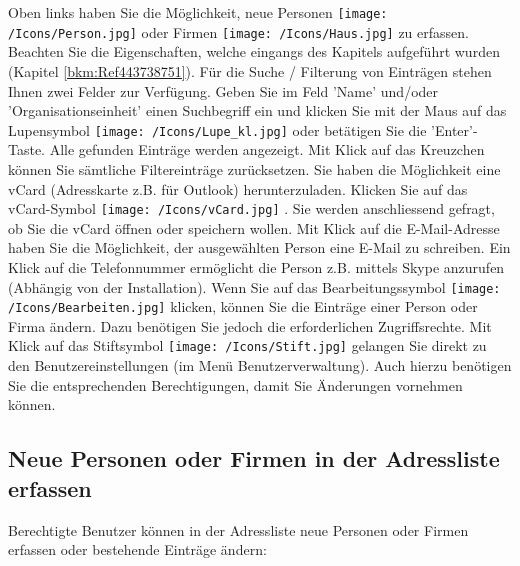 Oben links haben Sie die Möglichkeit, neue Personen \texttt{[image: /Icons/Person.jpg]} oder Firmen \texttt{[image: /Icons/Haus.jpg]} zu erfassen. Beachten Sie die Eigenschaften, welche eingangs des Kapitels aufgeführt wurden (Kapitel \ref{bkm:Ref443738751}). \newline
Für die Suche / Filterung von Einträgen stehen Ihnen zwei Felder zur Verfügung. Geben Sie im Feld 'Name' und/oder 'Organisationseinheit'  einen Suchbegriff ein und klicken Sie mit der Maus auf das Lupensymbol \texttt{[image: /Icons/Lupe\_kl.jpg]}  oder betätigen Sie die 'Enter'-Taste. Alle gefunden Einträge werden angezeigt. Mit Klick auf das Kreuzchen  können Sie sämtliche Filtereinträge zurücksetzen. \newline
Sie haben die Möglichkeit eine vCard (Adresskarte z.B. für Outlook) herunterzuladen. Klicken Sie auf das vCard-Symbol \texttt{[image: /Icons/vCard.jpg]} . Sie werden anschliessend gefragt, ob Sie die vCard öffnen
oder speichern wollen.\newline
Mit Klick auf die E-Mail-Adresse  haben Sie die Möglichkeit, der ausgewählten Person eine E-Mail zu schreiben. Ein Klick auf die Telefonnummer  ermöglicht die Person z.B. mittels Skype anzurufen (Abhängig von der Installation).\newline
Wenn Sie auf das Bearbeitungssymbol \texttt{[image: /Icons/Bearbeiten.jpg]}  klicken, können Sie die Einträge einer Person oder Firma ändern. Dazu benötigen Sie jedoch die erforderlichen Zugriffsrechte. Mit Klick auf das Stiftsymbol \texttt{[image: /Icons/Stift.jpg]}  gelangen Sie direkt zu den Benutzereinstellungen (im Menü Benutzerverwaltung). Auch hierzu benötigen Sie die entsprechenden Berechtigungen, damit Sie Änderungen vornehmen können.

\subsection{Neue Personen oder Firmen in der Adressliste erfassen}
\label{bkm:Ref2018071901}
Berechtigte Benutzer können in der Adressliste neue Personen oder Firmen erfassen oder bestehende Einträge ändern:

\vspace{\baselineskip}

